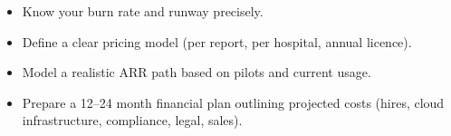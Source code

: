 \begin{itemize}[leftmargin=*]
  \item Know your burn rate and runway precisely.
  \item Define a clear pricing model (per report, per hospital, annual licence).
  \item Model a realistic \ac{ARR} path based on pilots and current usage.
  \item Prepare a 12–24 month financial plan outlining projected costs (hires, cloud infrastructure, compliance, legal, sales).
\end{itemize}











